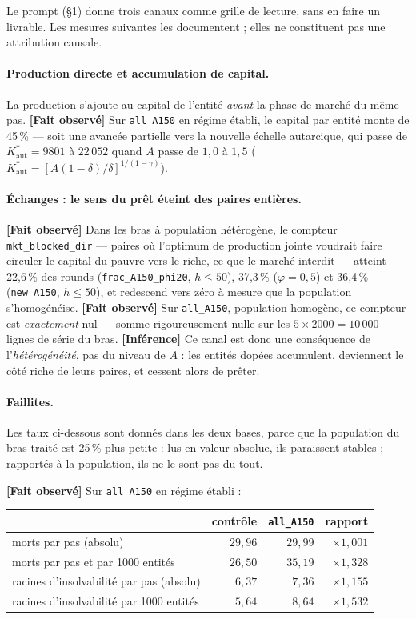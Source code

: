 \documentclass[11pt,a4paper]{article}
\newcommand{\code}[1]{\texttt{#1}}
\newcommand{\Kaut}{K^{*}_{\mathrm{aut}}}
\newcommand{\fait}{\textbf{[Fait observé]}}
\newcommand{\inference}{\textbf{[Inférence]}}
\begin{document}
Le prompt (§1) donne trois canaux comme grille de lecture, sans en faire
un livrable. Les mesures suivantes les documentent ; elles ne constituent
pas une attribution causale.

\paragraph{Production directe et accumulation de capital.} La production
s'ajoute au capital de l'entité \emph{avant} la phase de marché du même
pas. \fait{} Sur \code{all\_A150} en régime établi, le capital par entité
monte de 45\,\% --- soit une avancée partielle vers la nouvelle échelle
autarcique, qui passe de $\Kaut = 9801$ à $22\,052$ quand $A$ passe de
$1{,}0$ à $1{,}5$ ($\Kaut = [A(1-\delta)/\delta]^{1/(1-\gamma)}$).

\paragraph{Échanges : le sens du prêt éteint des paires entières.}
\fait{} Dans les bras à population hétérogène, le compteur
\code{mkt\_blocked\_dir} --- paires où l'optimum de production jointe
voudrait faire circuler le capital du pauvre vers le riche, ce que le
marché interdit --- atteint 22,6\,\% des rounds (\code{frac\_A150\_phi20},
$h\le50$), 37,3\,\% ($\varphi=0{,}5$) et 36,4\,\% (\code{new\_A150},
$h\le50$), et redescend vers zéro à mesure que la population
s'homogénéise. \fait{} Sur \code{all\_A150}, population homogène, ce
compteur est \emph{exactement} nul --- somme rigoureusement nulle sur les
$5 \times 2000 = 10\,000$ lignes de série du bras. \inference{} Ce canal
est donc une conséquence de l'\emph{hétérogénéité}, pas du niveau de $A$ :
les entités dopées accumulent, deviennent le côté riche de leurs paires, et
cessent alors de prêter.

\paragraph{Faillites.} Les taux ci-dessous sont donnés dans les deux bases,
parce que la population du bras traité est 25\,\% plus petite : lus en
valeur absolue, ils paraissent stables ; rapportés à la population, ils ne
le sont pas du tout.

\fait{} Sur \code{all\_A150} en régime établi :

\begin{center}
\begin{tabular}{@{}lrrr@{}}
\toprule
& \textbf{contrôle} & \textbf{\code{all\_A150}} & \textbf{rapport} \\
\midrule
morts par pas (absolu) & $29{,}96$ & $29{,}99$ & $\times1{,}001$ \\
morts par pas et par 1000 entités & $26{,}50$ & $35{,}19$ & $\times1{,}328$ \\
racines d'insolvabilité par pas (absolu) & $6{,}37$ & $7{,}36$ & $\times1{,}155$ \\
racines d'insolvabilité par 1000 entités & $5{,}64$ & $8{,}64$ & $\times1{,}532$ \\
\bottomrule
\end{tabular}
\end{center}
\end{document}
